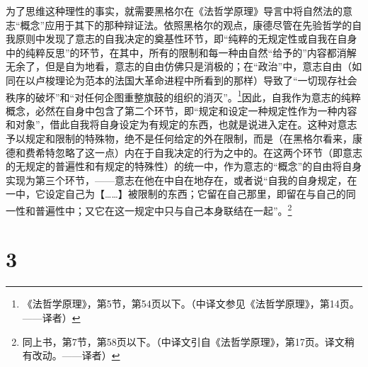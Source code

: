 为了思维这种理性的事实，就需要黑格尔在《法哲学原理》导言中将自然法的意志“概念”应用于其下的那种辩证法。依照黑格尔的观点，康德尽管在先验哲学的自我原则中发现了意志的自我决定的奠基性环节，即“纯粹的无规定性或自我在自身中的纯粹反思”的环节，在其中，所有的限制和每一种由自然“给予的”内容都消解无余了，但是自为地看，意志的自由仿佛只是消极的；在“政治”中，意志自由（如同在以卢梭理论为范本的法国大革命进程中所看到的那样）导致了“一切现存社会秩序的破坏”和“对任何企图重整旗鼓的组织的消灭”。\footnote{《法哲学原理》，第5节，第54页以下。（中译文参见《法哲学原理》，第14页。——译者）}因此，自我作为意志的纯粹概念，必然在自身中包含了第二个环节，即“规定和设定一种规定性作为一种内容和对象”，借此自我将自身设定为有规定的东西，也就是说进入定在。这种对意志予以规定和限制的特殊物，绝不是任何给定的外在限制，而是（在黑格尔看来，康德和费希特忽略了这一点）内在于自我决定的行为之中的。在这两个环节（即意志的无规定的普遍性和有规定的特殊性）的统一中，作为意志的“概念”的自由将自身实现为第三个环节，——意志在他在中自在地存在，或者说“自我的自身规定，在一中，它设定自己为【……】被限制的东西；它留在自己那里，即留在与自己的同一性和普遍性中；又它在这一规定中只与自己本身联结在一起”。\footnote{同上书，第7节，第58页以下。（中译文引自《法哲学原理》，第17页。译文稍有改动。——译者）}

\section*{3}

